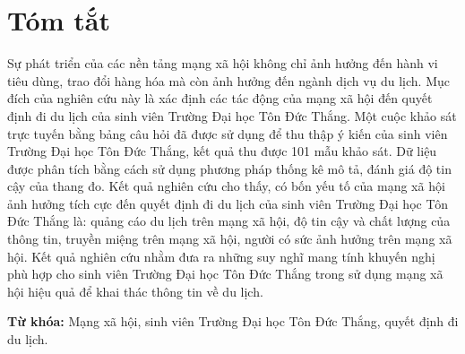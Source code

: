 \fontsize{13}{15}\selectfont
\section*{Tóm tắt}

Sự phát triển của các nền tảng mạng xã hội không chỉ ảnh hưởng đến hành vi tiêu dùng, trao đổi hàng hóa mà còn ảnh hưởng đến ngành dịch vụ du lịch. Mục đích của nghiên cứu này là xác định các tác động của mạng xã hội đến quyết định đi du lịch của sinh viên Trường Đại học Tôn Đức Thắng. Một cuộc khảo sát trực tuyến bằng bảng câu hỏi đã được sử dụng để thu thập ý kiến của sinh viên Trường Đại học Tôn Đức Thắng, kết quả thu được 101 mẫu khảo sát. Dữ liệu được phân tích bằng cách sử dụng phương pháp thống kê mô tả, đánh giá độ tin cậy của thang đo. Kết quả nghiên cứu cho thấy, có bốn yếu tố của mạng xã hội ảnh hưởng tích cực đến quyết định đi du lịch của sinh viên Trường Đại học Tôn Đức Thắng là: quảng cáo du lịch trên mạng xã hội, độ tin cậy và chất lượng của thông tin, truyền miệng trên mạng xã hội, người có sức ảnh hưởng trên mạng xã hội. Kết quả nghiên cứu nhằm đưa ra những suy nghĩ mang tính khuyến nghị phù hợp cho sinh viên Trường Đại học Tôn Đức Thắng trong sử dụng mạng xã hội hiệu quả để khai thác thông tin về du lịch.

\textbf{Từ khóa:} Mạng xã hội, sinh viên Trường Đại học Tôn Đức Thắng, quyết định đi du lịch.

